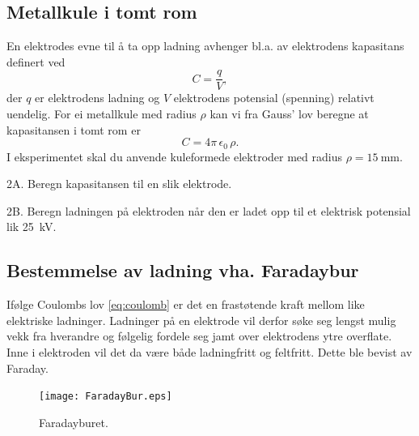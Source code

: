 \documentclass[../Elmag-labhefte-2020.tex]{subfiles}
\begin{document}
\subsection{Metallkule i tomt rom}

En elektrodes evne til å ta opp ladning avhenger bl.a. av elektrodens kapasitans definert ved
\begin{equation}
    C = \frac{q}{V},
    \label{eq:coulomb.3.1}
\end{equation}
der $q$ er elektrodens ladning og $V$ elektrodens potensial (spenning) relativt uendelig. For ei metall\-kule med radius $\rho$ kan vi fra Gauss' lov beregne at kapasitansen i tomt rom er
\begin{equation}
    C = 4\pi\, \epsilon_0 \, \rho .
    \label{eq:coulomb.3.2}
\end{equation}
%
I eksperimentet skal du anvende kuleformede elektroder med radius $\rho = \SI{15}{\milli\m}$.

{\itsf 2A.  Beregn kapasitansen til en slik elektrode.}

{\itsf 2B.  Beregn ladningen på elektroden når den er ladet opp til et elektrisk potensial lik \SI{25}{\kilo\volt}. }

\subsection{Bestemmelse av ladning vha. Faradaybur \label{ch.Faradaybur}}

Ifølge Coulombs lov \eqref{eq:coulomb} er det en frastøtende kraft mellom like elektriske ladninger. Ladninger på en elektrode vil derfor søke seg lengst mulig vekk fra hverandre og følgelig fordele seg jamt over elektrodens ytre overflate. Inne i elektroden vil det da være både ladningfritt og feltfritt. Dette ble bevist av Faraday.
\begin{figure}[!ht]
    \centering
    \texttt{[image: FaradayBur.eps]}
    \vspace{-5mm}
    \caption{%
        Faradayburet.
    }
    \label{fig:FaradayBur}
    \vspace{-5mm}
\end{figure}
 
\end{document}

